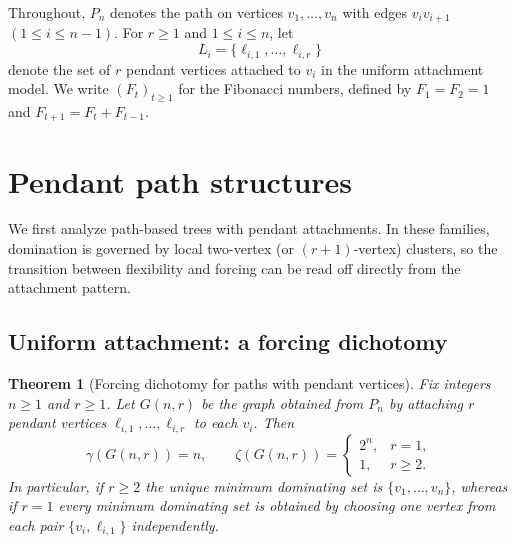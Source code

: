 \documentclass[11pt]{article}
\newtheorem{theorem}{Theorem}
\theoremstyle{definition}
\theoremstyle{remark}
\begin{document}
Throughout, $P_n$ denotes the path on vertices $v_1,\dots,v_n$ with edges $v_iv_{i+1}$ $(1\le i\le n-1)$.
For $r\ge 1$ and $1\le i\le n$, let
\[
L_i=\{\ell_{i,1},\dots,\ell_{i,r}\}
\]
denote the set of $r$ pendant vertices attached to $v_i$ in the uniform attachment model.
We write $(F_t)_{t\ge 1}$ for the Fibonacci numbers, defined by $F_1=F_2=1$ and
$F_{t+1}=F_t+F_{t-1}$.

\section{Pendant path structures}
We first analyze path-based trees with pendant attachments. In these families, domination is governed by
local two-vertex (or $(r+1)$-vertex) clusters, so the transition between flexibility and forcing can be
read off directly from the attachment pattern.

\subsection{Uniform attachment: a forcing dichotomy}
\begin{theorem}[Forcing dichotomy for paths with pendant vertices]\label{thm:uniform}
Fix integers $n\ge 1$ and $r\ge 1$. Let $G(n,r)$ be the graph obtained from $P_n$ by attaching $r$
pendant vertices $\ell_{i,1},\dots,\ell_{i,r}$ to each $v_i$. Then
\[
\gamma(G(n,r))=n,
\qquad
\zeta(G(n,r))=
\begin{cases}
2^n, & r=1,\\[2pt]
1, & r\ge 2.
\end{cases}
\]
In particular, if $r\ge 2$ the unique minimum dominating set is $\{v_1,\dots,v_n\}$, whereas if $r=1$
every minimum dominating set is obtained by choosing one vertex from each pair
$\{v_i,\ell_{i,1}\}$ independently.
\end{theorem}
\end{document}
